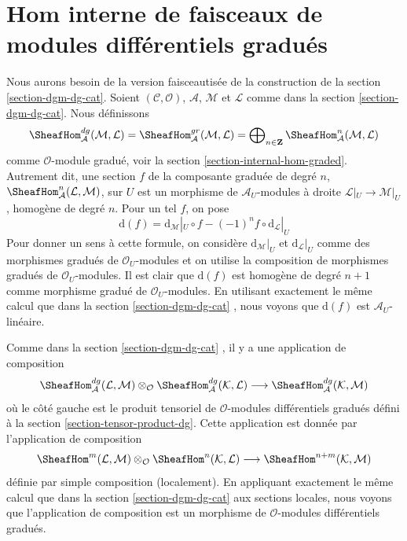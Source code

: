 \section{Hom interne de faisceaux de modules différentiels gradués}
\label{section-internal-hom-dg}

\noindent
Nous aurons besoin de la version faisceautisée de la construction de la section \ref{section-dgm-dg-cat}.
Soient $(\mathcal{C}, \mathcal{O})$, $\mathcal{A}$, $\mathcal{M}$ et $\mathcal{L}$ comme dans la section \ref{section-dgm-dg-cat}.
Nous définissons
$$
\SheafHom^{dg}_\mathcal{A}(\mathcal{M}, \mathcal{L}) =
\SheafHom^{gr}_\mathcal{A}(\mathcal{M}, \mathcal{L}) =
\bigoplus\nolimits_{n \in \mathbf{Z}}
\SheafHom^n_\mathcal{A}(\mathcal{M}, \mathcal{L})
$$
comme $\mathcal{O}$-module gradué, voir la section \ref{section-internal-hom-graded}.
Autrement dit, une section $f$ de la composante graduée de degré $n$, $\SheafHom^n_\mathcal{A}(\mathcal{L}, \mathcal{M})$, sur $U$ est un morphisme de $\mathcal{A}_U$-modules à droite $\mathcal{L}|_U \to \mathcal{M}|_U$, homogène de degré $n$.
Pour un tel $f$, on pose
$$
\text{d}(f) =
\text{d}_\mathcal{M}|_U \circ f - (-1)^n f \circ \text{d}_\mathcal{L}|_U
$$
Pour donner un sens à cette formule, on considère $\text{d}_\mathcal{M}|_U$ et $\text{d}_\mathcal{L}|_U$ comme des morphismes gradués de $\mathcal{O}_U$-modules et on utilise la composition de morphismes gradués de $\mathcal{O}_U$-modules.
Il est clair que $\text{d}(f)$ est homogène de degré $n + 1$ comme morphisme gradué de $\mathcal{O}_U$-modules.
En utilisant exactement le même calcul que dans la section \ref{section-dgm-dg-cat} , nous voyons que $\text{d}(f)$ est $\mathcal{A}_U$-linéaire.

\medskip\noindent
Comme dans la section \ref{section-dgm-dg-cat} , il y a une application de composition
$$
\SheafHom^{dg}_\mathcal{A}(\mathcal{L}, \mathcal{M}) \otimes_\mathcal{O}
\SheafHom^{dg}_\mathcal{A}(\mathcal{K}, \mathcal{L})
\longrightarrow
\SheafHom^{dg}_\mathcal{A}(\mathcal{K}, \mathcal{M})
$$
où le côté gauche est le produit tensoriel de $\mathcal{O}$-modules différentiels gradués défini à la section \ref{section-tensor-product-dg}.
Cette application est donnée par l'application de composition
$$
\SheafHom^m(\mathcal{L}, \mathcal{M}) \otimes_\mathcal{O}
\SheafHom^n(\mathcal{K}, \mathcal{L}) \longrightarrow
\SheafHom^{n + m}(\mathcal{K}, \mathcal{M})
$$
définie par simple composition (localement).
En appliquant exactement le même calcul que dans la section \ref{section-dgm-dg-cat} aux sections locales, nous voyons que l'application de composition est un morphisme de $\mathcal{O}$-modules différentiels gradués.

